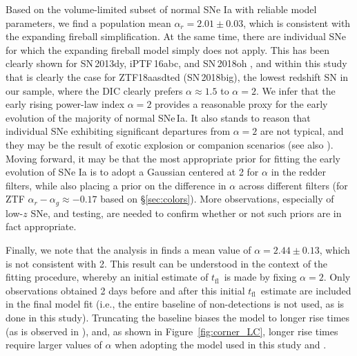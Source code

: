 \documentclass[twocolumn]{./aastex63}
\newcommand{\rztf}{$r_\mathrm{ZTF}$}
\newcommand{\gztf}{$g_\mathrm{ZTF}$}
\newcommand{\tfl}{$t_\mathrm{fl}$}
\begin{document}
Based on the volume-limited subset of normal SNe Ia with reliable model
parameters, we find a population mean $\alpha_r = 2.01 \pm 0.03$, which is
consistent with the expanding fireball simplification.
At the same time, there are individual SNe for which the expanding fireball
model simply does not apply. This has been clearly shown for SN\,2013dy,
iPTF\,16abc, and SN\,2018oh \citep{Zheng13,Miller18,Dimitriadis19}, and within this study that is clearly
the case for ZTF18aasdted (SN\,2018big), the lowest redshift SN in our sample,
where the DIC clearly prefers $\alpha \approx 1.5$ to $\alpha = 2$. We infer that the early rising power-law index $\alpha=2$ provides a reasonable proxy for the early evolution of the majority of normal SNe\,Ia. It also stands to
reason that individual SNe exhibiting significant departures from $\alpha = 2$
are not typical, and they may be the result of exotic explosion or companion
scenarios (see also \citealt{Miller18}). Moving forward, it may be that the
most appropriate prior for fitting the early evolution of SNe Ia is to adopt a
Gaussian centered at 2 for $\alpha$ in the redder filters, while also placing
a prior on the difference in $\alpha$ across different filters (for ZTF
$\alpha_r - \alpha_g \approx -0.17$ based on \S\ref{sec:colors}). More
observations, especially of low-$z$ SNe, and testing, are needed to confirm
whether or not such priors are in fact appropriate.

Finally, we note that the analysis in \citet{Firth15} finds a mean value of
$\alpha = 2.44 \pm 0.13$, which is not consistent with 2. This result can be
understood in the context of the \citet{Firth15} fitting procedure, whereby an
initial estimate of \tfl\ is made by fixing $\alpha = 2$. Only observations
obtained 2 days before and after this initial \tfl\ estimate are included in
the final model fit (i.e., the entire baseline of non-detections is not used,
as is done in this study). Truncating the baseline biases the model to longer
rise times (as is observed in \citealt{Firth15}), and, as shown in
Figure~\ref{fig:corner_LC}, longer rise times require larger values of
$\alpha$ when adopting the model used in this study and \citet{Firth15}.
\end{document}
